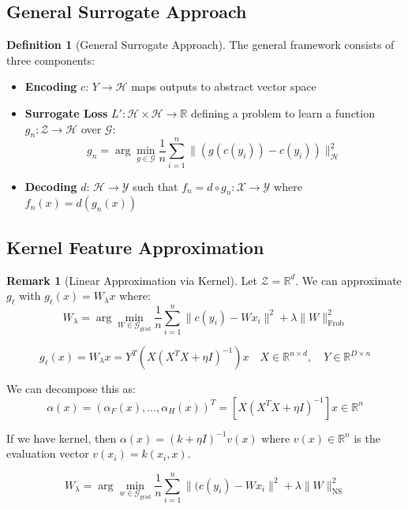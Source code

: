 \documentclass[12pt,a4paper]{article}
\theoremstyle{definition}
\newtheorem{definition}{Definition}[section]
\newtheorem{remark}{Remark}[section]
\begin{document}
\subsection{General Surrogate Approach}

\begin{definition}[General Surrogate Approach]
The general framework consists of three components:

\begin{itemize}
    \item \textbf{Encoding} $c$: $Y \to \mathcal{H}$ maps outputs to abstract vector space
    
    \item \textbf{Surrogate Loss} $L': \mathcal{H} \times \mathcal{H} \to \mathbb{R}$ defining a problem to learn a function $g_n: \mathcal{Z} \to \mathcal{H}$ over $\mathcal{G}$:
    \[
    g_n = \arg\min_{g \in \mathcal{G}} \frac{1}{n}\sum_{i=1}^n \|(g(c(y_i)) - c(y_i))\|_\mathcal{H}^2
    \]
    
    \item \textbf{Decoding} $d$: $\mathcal{H} \to \mathcal{Y}$ such that $f_n = d \circ g_n: \mathcal{X} \to \mathcal{Y}$ where $f_n(x) = d(g_n(x))$
\end{itemize}
\end{definition}

\subsection{Kernel Feature Approximation}

\begin{remark}[Linear Approximation via Kernel]
Let $\mathcal{Z} = \mathbb{R}^d$. We can approximate $g_\ell$ with $g_\ell(x) = W_\lambda x$ where:
\[
W_\lambda = \arg\min_{W \in \mathcal{G}_\text{grad}} \frac{1}{n}\sum_{i=1}^n \|c(y_i) - W x_i\|^2 + \lambda \|W\|_{\text{Frob}}^2
\]

\[
g_\ell(x) = W_\lambda x = Y^T(X(X^T X + \eta I)^{-1}) x \quad X \in \mathbb{R}^{n \times d}, \quad Y \in \mathbb{R}^{D \times n}
\]

We can decompose this as:
\[
\alpha(x) = (\alpha_F(x), \ldots, \alpha_H(x))^T = [X(X^T X + \eta I)^{-1}] x \in \mathbb{R}^n
\]

If we have kernel, then $\alpha(x) = (k + \eta I)^{-1} v(x)$ where $v(x) \in \mathbb{R}^n$ is the evaluation vector $v(x_i) = k(x_i, x)$.

\[
W_\lambda = \arg\min_{w \in \mathcal{G}_\text{grad}} \frac{1}{n}\sum_{i=1}^n \|(c(y_i) - W x_i\|^2 + \lambda \|W\|_{\text{NS}}^2
\]
\end{remark}
\end{document}
